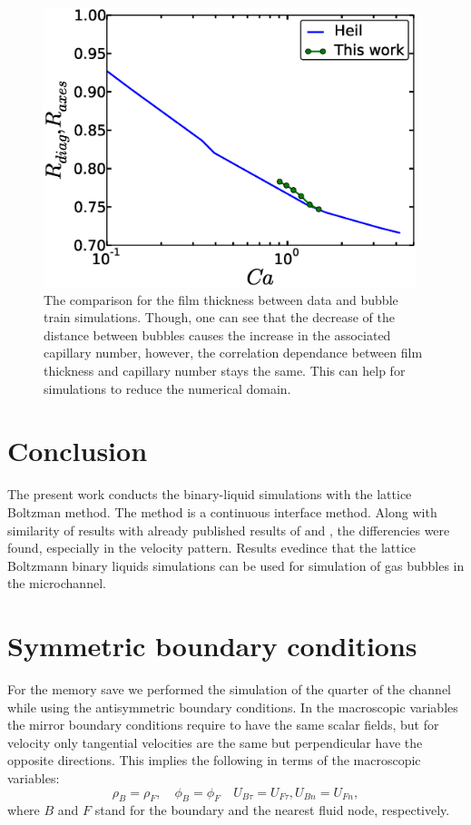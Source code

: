 \documentclass{article}
\begin{document}
\begin{figure}
\includegraphics[width=0.97\textwidth]{Figures/capillaries_comparison_train.eps}
\caption{The comparison for the film thickness between \citet{heil-threedim} data and bubble train
simulations. Though, one can see that the decrease of the distance between bubbles causes the
increase in the associated capillary number, however, the correlation dependance between film
thickness and capillary number stays the same. This can help for simulations to reduce the
numerical domain. \label{fig:capillaries:train}}
\end{figure}

\section{Conclusion}
The present work conducts the binary-liquid simulations with the lattice Boltzman method. The
method is a continuous interface method. Along with similarity of results with already published
results of \citet{heil-threedim} and \citet{wang-non-circular}, the differencies were found,
especially in the velocity pattern. Results evedince that the lattice Boltzmann binary liquids
simulations can be used for simulation of gas bubbles in the microchannel. 

\appendix
\section{Symmetric boundary conditions}
\label{append:sym}
For the memory save we performed the simulation of the quarter of the channel while using the
antisymmetric boundary conditions. In the macroscopic variables the mirror boundary conditions
require to have the same scalar fields, but for velocity only tangential velocities are the same
but perpendicular have the opposite directions. This implies the following in terms of the
macroscopic variables:
\begin{equation}
\rho_B = \rho_F, \quad \phi_B = \phi_F \quad U_{B\tau}=U_{F\tau}, U_{B n}=U_{F n}, 
\end{equation}
 where $B$ and $F$ stand for the boundary and the nearest fluid node, respectively. 
\end{document}
